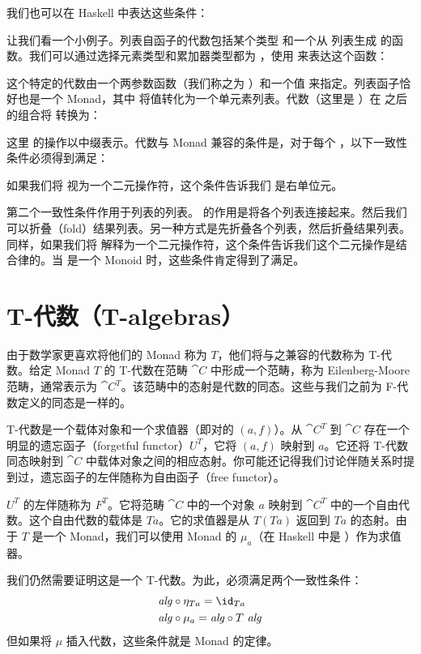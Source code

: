\noindent
我们也可以在 Haskell 中表达这些条件：

让我们看一个小例子。列表自函子的代数包括某个类型  和一个从  列表生成  的函数。我们可以通过选择元素类型和累加器类型都为 ，使用  来表达这个函数：

这个特定的代数由一个两参数函数（我们称之为 ）和一个值  来指定。列表函子恰好也是一个 Monad，其中  将值转化为一个单元素列表。代数（这里是 ）在  之后的组合将  转换为：

这里  的操作以中缀表示。代数与 Monad 兼容的条件是，对于每个 ，以下一致性条件必须得到满足：

如果我们将  视为一个二元操作符，这个条件告诉我们  是右单位元。

第二个一致性条件作用于列表的列表。  的作用是将各个列表连接起来。然后我们可以折叠（fold）结果列表。另一种方式是先折叠各个列表，然后折叠结果列表。同样，如果我们将  解释为一个二元操作符，这个条件告诉我们这个二元操作是结合律的。当  是一个 Monoid 时，这些条件肯定得到了满足。

\section{T-代数（T-algebras）}

由于数学家更喜欢将他们的 Monad 称为 $T$，他们将与之兼容的代数称为 T-代数。给定 Monad $T$ 的 T-代数在范畴 $\cat{C}$ 中形成一个范畴，称为 Eilenberg-Moore 范畴，通常表示为 $\cat{C}^T$。该范畴中的态射是代数的同态。这些与我们之前为 F-代数定义的同态是一样的。

T-代数是一个载体对象和一个求值器（即对的 $(a, f)$）。从 $\cat{C}^T$ 到 $\cat{C}$ 存在一个明显的遗忘函子（forgetful functor）$U^T$，它将 $(a, f)$ 映射到 $a$。它还将 T-代数同态映射到 $\cat{C}$ 中载体对象之间的相应态射。你可能还记得我们讨论伴随关系时提到过，遗忘函子的左伴随称为自由函子（free functor）。

$U^T$ 的左伴随称为 $F^T$。它将范畴 $\cat{C}$ 中的一个对象 $a$ 映射到 $\cat{C}^T$ 中的一个自由代数。这个自由代数的载体是 $T a$。它的求值器是从 $T (T a)$ 返回到 $T a$ 的态射。由于 $T$ 是一个 Monad，我们可以使用 Monad 的 $\mu_a$（在 Haskell 中是 ）作为求值器。

我们仍然需要证明这是一个 T-代数。为此，必须满足两个一致性条件：
\begin{align*}
  \mathit{alg} & \circ \eta_{Ta} = \id_{Ta}     \\
  \mathit{alg} & \circ \mu_a = \mathit{alg} \circ T\ \mathit{alg}
\end{align*}
但如果将 $\mu$ 插入代数，这些条件就是 Monad 的定律。

